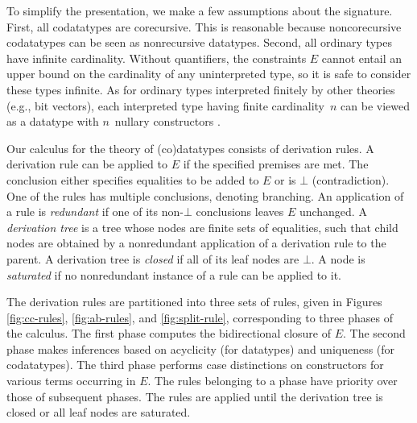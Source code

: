 \documentclass[letter]{article}
\theoremstyle{definition}
\newcommand\Sig{\mathrm{\Sigma}}
\newcommand\const[1]{\textsf{#1}}
\renewcommand{\vec}[1]{\bar #1}
\newcommand{\Ec}{E}
\newcommand\Types{\mathcalx{Y}}
\newcommand\Codata{\Types_{\mathrm{codt}}}
\newcommand\negvthinspace{\kern-0.083333em}
\begin{document}
To simplify the presentation, we make a few assumptions about
the signature. %
First, all codatatypes %
are corecursive. This is reasonable
because noncorecursive codatatypes can be seen as nonrecursive
datatypes.
Second, all ordinary types have infinite cardinality.
Without quantifiers, the constraints $\Ec$ cannot entail an upper
bound on the cardinality of any uninterpreted type, so it is safe to consider these types
infinite. As for ordinary types interpreted finitely by other theories (e.g.,
bit vectors), each interpreted type having finite cardinality~$n$
can be viewed as a %
datatype with $n$~nullary constructors
\cite{barrett-et-al-2007}.




Our calculus for the theory of (co)datatypes
consists of derivation rules.
A derivation rule can be applied to $\Ec$ if %
the specified
premises are met.
The conclusion either specifies equalities to be added to $\Ec$
or is $\bot$ (contradiction).
One of the rules has multiple conclusions, %
denoting branching.
%
An application of a rule is \emph{redundant} if one of its non-$\bot$
conclusions leaves $\Ec$ unchanged.
A \emph{derivation tree} is a %
tree whose nodes are finite sets of
equalities, such that child nodes are obtained by a nonredundant application of a
derivation rule to the parent. A derivation tree is \emph{closed} if all of
its leaf nodes are $\bot$. A node is \emph{saturated} if no nonredundant
instance of a rule can be applied to it.

The derivation rules are partitioned into three sets of rules, given in
Figures \ref{fig:cc-rules}, \ref{fig:ab-rules}, and \ref{fig:split-rule},
corresponding to three
phases of the calculus. The first phase computes the bidirectional closure of $\Ec$. The second
phase makes inferences based on acyclicity (for datatypes) and uniqueness
(for codatatypes).
The third phase performs case distinctions on constructors for
various terms occurring in $\Ec$.
%
The rules belonging to a phase have priority over those of %
subsequent
phases. The rules are applied until the derivation tree is closed or all leaf nodes
are saturated.
\end{document}
